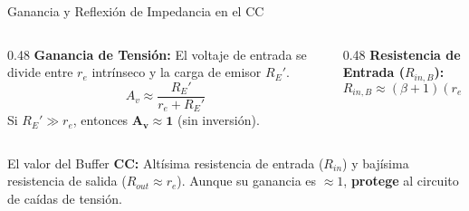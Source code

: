 \documentclass[aspectratio=169]{beamer}
\begin{document}
\begin{frame}{Ganancia y Reflexión de Impedancia en el CC}
    \begin{columns}
        \begin{column}{0.48\textwidth}
            \textbf{Ganancia de Tensión:}
            El voltaje de entrada se divide entre $r_e$ intrínseco y la carga de emisor $R_E'$.
            \begin{equation*}
                A_v \approx \frac{R_E'}{r_e + R_E'}
            \end{equation*}
            Si $R_E' \gg r_e$, entonces $\mathbf{A_v \approx 1}$ (sin inversión).
        \end{column}
        \begin{column}{0.48\textwidth}
            \textbf{Resistencia de Entrada ($R_{in,B}$):}
            \begin{equation*}
                R_{in,B} \approx (\beta + 1)(r_e + R_E')
            \end{equation*}
            
            \centering
            \vspace{0.4cm}
        \end{column}
    \end{columns}
    \vspace{0.4cm}
    \begin{alertblock}{El valor del Buffer}
        \textbf{CC:} Altísima resistencia de entrada ($R_{in}$) y bajísima resistencia de salida ($R_{out} \approx r_e$). Aunque su ganancia es $\approx 1$, \textbf{protege} al circuito de caídas de tensión.
    \end{alertblock}
\end{frame}
\end{document}
